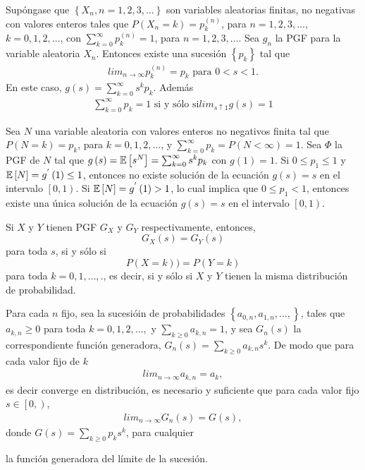 \begin{Teo}
Sup\'ongase que $\left\{X_{n},n=1,2,3,\ldots\right\}$ son
variables aleatorias finitas, no negativas con valores enteros
tales que $P\left(X_{n}=k\right)=p_{k}^{(n)}$, para
$n=1,2,3,\ldots$, $k=0,1,2,\ldots$, con
$\sum_{k=0}^{\infty}p_{k}^{(n)}=1$, para $n=1,2,3,\ldots$. Sea
$g_{n}$ la PGF para la variable aleatoria $X_{n}$. Entonces existe
una sucesi\'on $\left\{p_{k}\right\}$ tal que \begin{eqnarray*}
lim_{n\rightarrow\infty}p_{k}^{(n)}=p_{k}\textrm{ para }0<s<1.
\end{eqnarray*}
En este caso, $g\left(s\right)=\sum_{k=0}^{\infty}s^{k}p_{k}$.
Adem\'as
\begin{eqnarray*}
\sum_{k=0}^{\infty}p_{k}=1\textrm{ si y s\'olo si
}lim_{s\uparrow1}g\left(s\right)=1
\end{eqnarray*}
\end{Teo}

\begin{Teo}
Sea $N$ una variable aleatoria con valores enteros no negativos
finita tal que $P\left(N=k\right)=p_{k}$, para $k=0,1,2,\ldots$, y
$\sum_{k=0}^{\infty}p_{k}=P\left(N<\infty\right)=1$. Sea $\Phi$ la
PGF de $N$ tal que
$g\left(s\right)=\mathbb{E}\left[s^{N}\right]=\sum_{k=0}^{\infty}s^{k}p_{k}$
con $g\left(1\right)=1$. Si $0\leq p_{1}\leq1$ y
$\mathbb{E}\left[N\right]=g^{'}\left(1\right)\leq1$, entonces no existe
soluci\'on  de la ecuaci\'on $g\left(s\right)=s$ en el intervalo
$\left[0,1\right)$. Si $\mathbb{E}\left[N\right]=g^{'}\left(1\right)>1$,
lo cual implica que $0\leq p_{1}<1$, entonces existe una \'unica
soluci\'on de la ecuaci\'on $g\left(s\right)=s$ en el intervalo
$\left[0,1\right)$.
\end{Teo}


\begin{Teo}
Si $X$ y $Y$ tienen PGF $G_{X}$ y $G_{Y}$ respectivamente,
entonces,\[G_{X}\left(s\right)=G_{Y}\left(s\right)\] para toda
$s$, si y s\'olo si \[P\left(X=k\right))=P\left(Y=k\right)\] para
toda $k=0,1,\ldots,$., es decir, si y s\'olo si $X$ y $Y$ tienen
la misma distribuci\'on de probabilidad.
\end{Teo}


\begin{Teo}
Para cada $n$ fijo, sea la sucesi\'oin de probabilidades
$\left\{a_{0,n},a_{1,n},\ldots,\right\}$, tales que $a_{k,n}\geq0$
para toda $k=0,1,2,\ldots,$ y $\sum_{k\geq0}a_{k,n}=1$, y sea
$G_{n}\left(s\right)$ la correspondiente funci\'on generadora,
$G_{n}\left(s\right)=\sum_{k\geq0}a_{k,n}s^{k}$. De modo que para
cada valor fijo de $k$
\begin{eqnarray*}
lim_{n\rightarrow\infty}a_{k,n}=a_{k},
\end{eqnarray*}
es decir converge en distribuci\'on, es necesario y suficiente que
para cada valor fijo $s\in\left[0,\right)$,
\begin{eqnarray*}
lim_{n\rightarrow\infty}G_{n}\left(s\right)=G\left(s\right),
\end{eqnarray*}
donde $G\left(s\right)=\sum_{k\geq0}p_{k}s^{k}$, para cualquier

la funci\'on generadora del l\'imite de la sucesi\'on.
\end{Teo}

